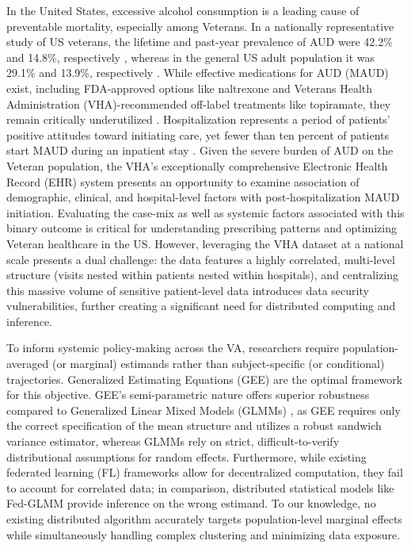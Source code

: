 \documentclass[useAMS,referee, usegraphicx]{biom}
\begin{document}
\noindent In the United States, excessive alcohol consumption is a leading cause of preventable mortality, especially among Veterans. In a nationally representative study of US veterans, the lifetime and past-year prevalence of AUD were 42.2\% and 14.8\%, respectively \citep{fuehrlein2016burden}, whereas in the general US adult population it was 29.1\% and 13.9\%, respectively \citep{grant2015epidemiology}. While effective medications for AUD (MAUD) exist, including FDA-approved options like naltrexone and Veterans Health Administration (VHA)-recommended off-label treatments like topiramate, they remain critically underutilized  \citep{mason2022looking}. Hospitalization represents a period of patients' positive attitudes toward initiating care, yet fewer than ten percent of patients start MAUD during an inpatient stay \citep{joudrey2020inpatient}. Given the severe burden of AUD on the Veteran population, the VHA’s exceptionally comprehensive Electronic Health Record (EHR) system presents an opportunity to examine association of demographic, clinical, and hospital-level factors with post-hospitalization MAUD initiation. Evaluating the case-mix as well as systemic factors associated with this binary outcome is critical for understanding prescribing patterns and optimizing Veteran healthcare in the US. However, leveraging the VHA dataset at a national scale presents a dual challenge: the data features a highly correlated, multi-level structure (visits nested within patients nested within hospitals), and centralizing this massive volume of sensitive patient-level data introduces data security vulnerabilities, further creating a significant need for distributed computing and inference.

To inform systemic policy-making across the VA, researchers require population-averaged (or marginal) estimands rather than subject-specific (or conditional) trajectories. Generalized Estimating Equations (GEE) \citep{liang1986longitudinal, zeger1988models} are the optimal framework for this objective. GEE's semi-parametric nature offers superior robustness compared to Generalized Linear Mixed Models (GLMMs) \citep{breslow1993approximate}, as GEE requires only the correct specification of the mean structure and utilizes a robust sandwich variance estimator, whereas GLMMs rely on strict, difficult-to-verify distributional assumptions for random effects. Furthermore, while existing federated learning (FL) frameworks \citep{mcmahan2017communication, li2020federated, durmus2021federated} allow for decentralized computation, they fail to account for correlated data; in comparison, distributed statistical models like Fed-GLMM \citep{yan2023privacy} provide inference on the wrong estimand. To our knowledge, no existing distributed algorithm accurately targets population-level marginal effects while simultaneously handling complex clustering and minimizing data exposure.
\end{document}
